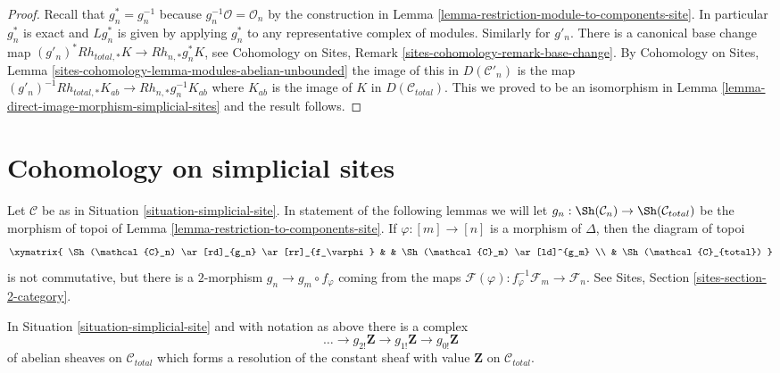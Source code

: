 \begin{proof}
Recall that $g_n^* = g_n^{-1}$ because $g_n^{-1}\mathcal{O} = \mathcal{O}_n$
by the construction in Lemma \ref{lemma-restriction-module-to-components-site}.
In particular $g_n^*$ is exact and $Lg_n^*$ is given by applying $g_n^*$
to any representative complex of modules. Similarly for $g'_n$.
There is a canonical base change map
$(g'_n)^*Rh_{total, *}K \to Rh_{n, *}g_n^*K$, see
Cohomology on Sites, Remark \ref{sites-cohomology-remark-base-change}.
By Cohomology on Sites, Lemma
\ref{sites-cohomology-lemma-modules-abelian-unbounded}
the image of this in $D(\mathcal{C}'_n)$ is the map
$(g'_n)^{-1}Rh_{total, *}K_{ab} \to Rh_{n, *}g_n^{-1}K_{ab}$
where $K_{ab}$ is the image of $K$ in $D(\mathcal{C}_{total})$.
This we proved to be an isomorphism in
Lemma \ref{lemma-direct-image-morphism-simplicial-sites}
and the result follows.
\end{proof}








\section{Cohomology on simplicial sites}
\label{section-cohomology-simplicial-sites}

\noindent
Let $\mathcal{C}$ be as in Situation \ref{situation-simplicial-site}.
In statement of the following lemmas we will let
$g_n : \Sh(\mathcal{C}_n) \to \Sh(\mathcal{C}_{total})$ be the
morphism of topoi of
Lemma \ref{lemma-restriction-to-components-site}. If $\varphi : [m] \to [n]$
is a morphism of $\Delta$, then the diagram of topoi
$$
\xymatrix{
\Sh(\mathcal{C}_n) \ar[rd]_{g_n} \ar[rr]_{f_\varphi} & &
\Sh(\mathcal{C}_m) \ar[ld]^{g_m} \\
& \Sh(\mathcal{C}_{total})
}
$$
is not commutative, but there is a $2$-morphism $g_n \to g_m \circ f_\varphi$
coming from the maps
$\mathcal{F}(\varphi) : f_\varphi^{-1}\mathcal{F}_m \to \mathcal{F}_n$.
See Sites, Section \ref{sites-section-2-category}.

\begin{lemma}
\label{lemma-simplicial-resolution-Z-site}
In Situation \ref{situation-simplicial-site} and with notation as above
there is a complex
$$
\ldots \to g_{2!}\mathbf{Z} \to g_{1!}\mathbf{Z} \to g_{0!}\mathbf{Z}
$$
of abelian sheaves on $\mathcal{C}_{total}$ which forms a resolution of
the constant sheaf with value $\mathbf{Z}$ on $\mathcal{C}_{total}$.
\end{lemma}

